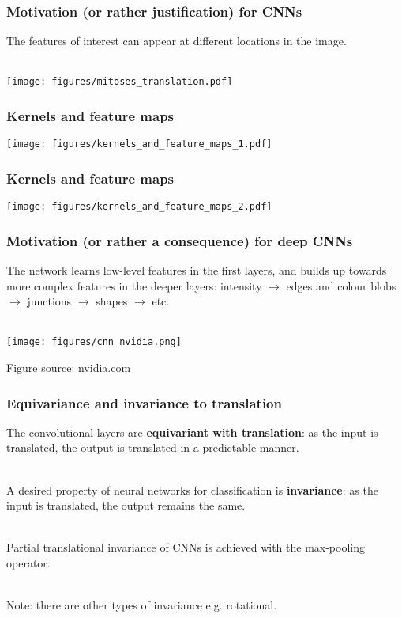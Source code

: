 \documentclass[notes]{beamer}          %
\begin{document}
\begin{frame}
\frametitle{Motivation (or rather justification) for CNNs}
The features of interest can appear at different locations in the image. \\~\
\begin{center}
\texttt{[image: figures/mitoses\_translation.pdf]} \\
\end{center}
\end{frame}

\begin{frame}
\frametitle{Kernels and feature maps}
\begin{center}
\texttt{[image: figures/kernels\_and\_feature\_maps\_1.pdf]} \\
\end{center}
\end{frame}

\begin{frame}
\frametitle{Kernels and feature maps}
\begin{center}
\texttt{[image: figures/kernels\_and\_feature\_maps\_2.pdf]} \\
\end{center}
\end{frame}


\begin{frame}
\frametitle{Motivation (or rather a consequence) for deep CNNs}
The network learns low-level features in the first layers, and builds up towards more complex features in the deeper layers: intensity $\rightarrow$ edges and colour blobs $\rightarrow$ junctions $\rightarrow$ shapes $\rightarrow$ etc. \\~\
\begin{center}
\texttt{[image: figures/cnn\_nvidia.png]} \\
\end{center}
\vfill
\tiny{Figure source: nvidia.com}
\end{frame}


\begin{frame}
\frametitle{Equivariance and invariance to translation}
The convolutional layers are \textbf{equivariant with translation}: as the input is translated, the output is translated in a predictable manner. \\~\

\pause
A desired property of neural networks for classification is \textbf{invariance}: as the input is translated, the output remains the same. \\~\

Partial translational invariance of CNNs is achieved with the max-pooling operator.\\~\

\tiny{Note: there are other types of invariance e.g. rotational.}
\end{frame}
\end{document}

